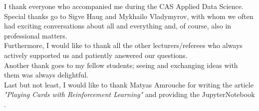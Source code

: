 \documentclass[
11pt, %
oneside, %
english, %
singlespacing, %
liststotoc, %
headsepline, %
chapterinoneline, %
consistentlayout, %
]{MastersDoctoralThesis} %
\begin{document}


\newpage


\begin{acknowledgements}
\addchaptertocentry{\acknowledgementname} %

I thank everyone who accompanied me during the CAS Applied Data Science.  \\

\noindent
Special thanks go to Sigve Haug and Mykhailo Vladymyrov, with whom we often had exciting conversations about all and everything and, of course, also in professional matters. \\

\noindent
Furthermore, I would like to thank all the other lecturers/referees who always actively supported us and patiently answered our questions. \\

\noindent
Another thank goes to my fellow students; seeing and exchanging ideas with them was always delightful. \\

\noindent
Last but not least, I would like to thank Matyas Amrouche for writing the article \textit{"Playing Cards with Reinforcement Learning"} \cite{easy21} and providing the JupyterNotebook \cite{easy21_explanation}.


\end{acknowledgements}
\newpage





\appendix %






\end{document}
